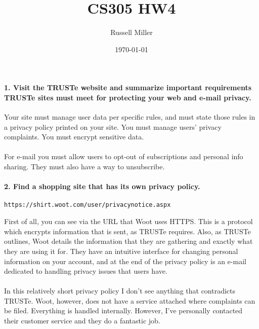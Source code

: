 \documentclass{article}
\title{CS305 HW4}
\author{Russell Miller}
\date{\today}
\begin{document}
\maketitle

\paragraph{1. Visit the TRUSTe website and summarize important requirements 
TRUSTe sites must meet for protecting your web and e-mail privacy.\\}
Your site must manage user data per specific rules, and must state those rules in
a privacy policy printed on your site. You must manage users' privacy complaints.
You must encrypt sensitive data.\\
\\
For e-mail you must allow users to opt-out of subscriptions and personal info
sharing. They must also have a way to unsubscribe.

\paragraph{2. Find a shopping site that has its own privacy policy.}
\begin{verbatim}
https://shirt.woot.com/user/privacynotice.aspx
\end{verbatim}
First of all, you can see via the URL that Woot uses HTTPS. This is a protocol 
which encrypts information that is sent, as TRUSTe requires. Also, as TRUSTe 
outlines, Woot details the information that they are gathering and exactly what they 
are using it for. They have an intuitive interface for changing personal information
on your account, and at the end of the privacy policy is an e-mail dedicated to
handling privacy issues that users have.\\
\\
In this relatively short privacy policy I don't see anything that contradicts TRUSTe.
Woot, however, does not have a service attached where complaints can be filed.
Everything is handled internally. However, I've personally contacted their customer 
service and they do a fantastic job.
\end{document}
